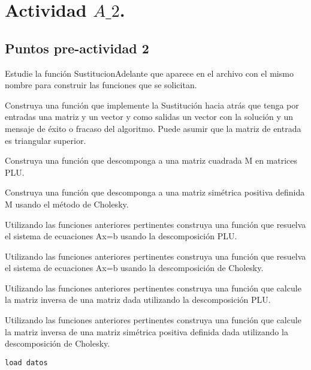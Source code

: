 \documentclass[10pt]{article}
\begin{document}
{\Huge\section*{Actividad $A\_2$.}}

\tableofcontents
\vspace*{4em}



{}
\subsection*{Puntos pre-actividad 2}



Estudie la función SustitucionAdelante que aparece en el archivo con el mismo
nombre para construir las funciones que se solicitan.



Construya una función que implemente la Sustitución hacia atrás que tenga por
entradas una matriz y un vector y como salidas un vector con la solución y un
mensaje de éxito o fracaso del algoritmo. Puede asumir que la matriz de entrada
es triangular superior.



Construya una función que descomponga a una matriz cuadrada M en matrices PLU.



Construya una función que descomponga a una matriz simétrica positiva definida
M usando el método de Cholesky.



Utilizando las funciones anteriores pertinentes construya una función que
resuelva el sistema de ecuaciones Ax=b usando la descomposición PLU.



Utilizando las funciones anteriores pertinentes construya una función que
resuelva el sistema de ecuaciones Ax=b usando la descomposición de Cholesky.



Utilizando las funciones anteriores pertinentes construya una función que
calcule la matriz inversa de una matriz dada utilizando la descomposición PLU.



Utilizando las funciones anteriores pertinentes construya una función que
calcule la matriz inversa de una matriz simétrica positiva definida dada
utilizando la descomposición de Cholesky.

\begin{lstlisting}
load datos
\end{lstlisting}
\end{document}
